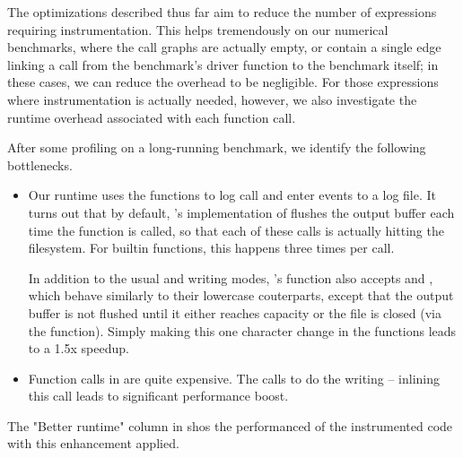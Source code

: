The optimizations described thus far aim to reduce the number of expressions
requiring instrumentation. This helps tremendously on our numerical benchmarks,
where the call graphs are actually empty, or contain a single edge linking a
call from the benchmark's driver function to the benchmark itself; in these
cases, we can reduce the overhead to be negligible. For those expressions
where instrumentation is actually needed, however, we also investigate the
runtime overhead associated with each function call.

After some profiling on a long-running benchmark, we identify the following
bottlenecks.

\begin{itemize}
  \item Our runtime uses the  functions to log call and enter
    events to a log file. It turns out that by default, \matlab's
    implementation of  flushes the output buffer each time the
    function is called, so that each of these calls is actually hitting the
    filesystem. For builtin functions, this happens three times per call.

    In addition to the usual  and  writing modes,
    \matlab's  function also accepts  and ,
    which behave similarly to their lowercase couterparts, except that the
    output buffer is not flushed until it either reaches capacity or the file
    is closed (via the  function). Simply making this one
    character change in the  functions leads to
    a 1.5x speedup.

  \item Function calls in \matlab are quite expensive. The
     calls 
    to do the writing -- inlining this call leads to significant performance
    boost.
\end{itemize}

The "Better runtime" column in  shos
the performanced of the instrumented code with this enhancement applied.
